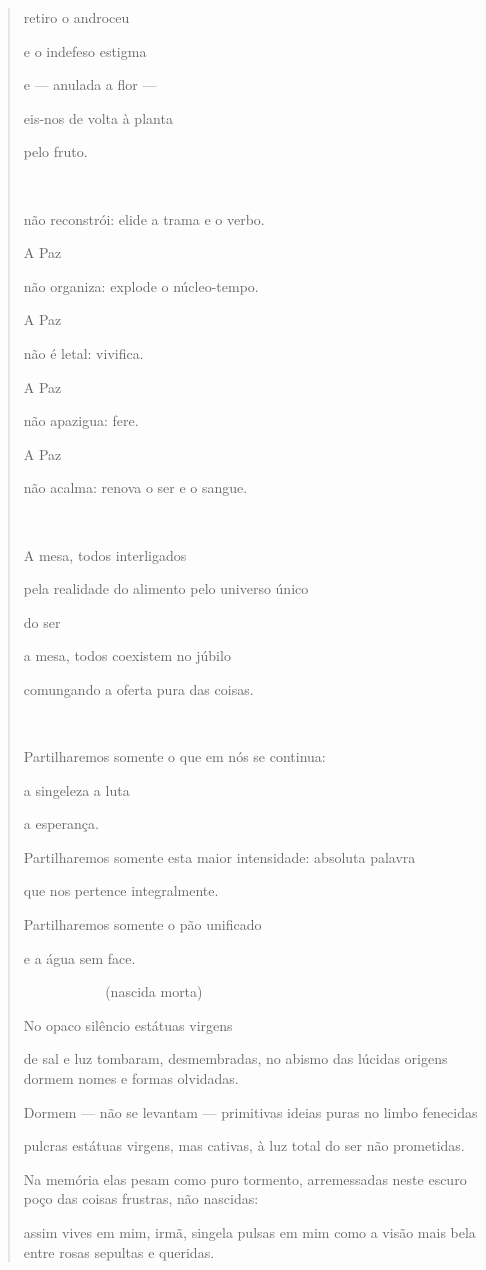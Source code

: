 \begin{quote}
retiro o androceu

e o indefeso estigma

e --- anulada a flor ---

eis-nos de volta à planta

pelo fruto.

 

não reconstrói: elide a trama e o verbo.

A Paz

não organiza: explode o núcleo-tempo.

A Paz

não é letal: vivifica.

A Paz

não apazigua: fere.

A Paz

não acalma: renova o ser e o sangue.



A mesa, todos interligados

pela realidade do alimento pelo universo único

do ser

a mesa, todos coexistem no júbilo

comungando a oferta pura das coisas.



Partilharemos somente o que em nós se continua:

a singeleza a luta

a esperança.

Partilharemos somente esta maior intensidade: absoluta palavra

que nos pertence integralmente.

Partilharemos somente o pão unificado

e a água sem face.

    (nascida morta)

No opaco silêncio estátuas virgens

de sal e luz tombaram, desmembradas, no abismo das lúcidas origens
dormem nomes e formas olvidadas.

Dormem --- não se levantam --- primitivas ideias puras no limbo
fenecidas

pulcras estátuas virgens, mas cativas, à luz total do ser não
prometidas.

Na memória elas pesam como puro tormento, arremessadas neste escuro poço
das coisas frustras, não nascidas:

assim vives em mim, irmã, singela pulsas em mim como a visão mais bela
entre rosas sepultas e queridas.


\end{quote}
